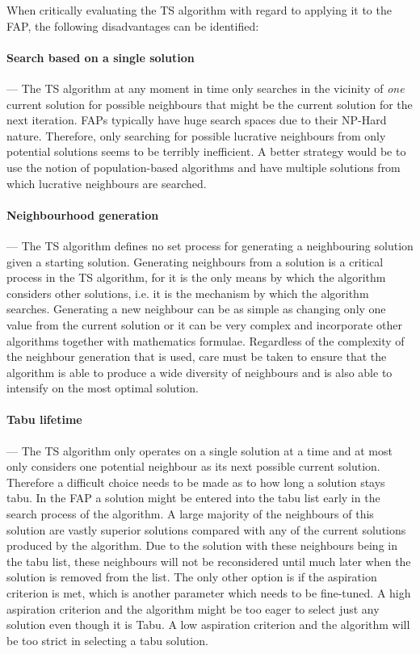 When critically evaluating the TS algorithm with regard to applying it to the FAP, the following disadvantages can be identified:
\paragraph{Search based on a single solution}
--- The TS algorithm at any moment in time only searches in the vicinity of \emph{one} current solution for possible neighbours that might be the current solution for the next iteration. FAPs typically have huge search spaces due to their NP-Hard nature. Therefore, only searching for possible lucrative neighbours from only potential solutions seems to be terribly inefficient. A better strategy would be to use the notion of population-based algorithms and have multiple solutions from which lucrative neighbours are searched.
\paragraph{Neighbourhood generation}
--- The TS algorithm defines no set process for generating a neighbouring solution given a starting solution. Generating neighbours from a solution is a critical process in the TS algorithm, for it is the only means by which the algorithm considers other solutions, i.e. it is the mechanism by which the algorithm searches. Generating a new neighbour can be as simple as changing only one value from the current solution or it can be very complex and incorporate other algorithms together with mathematics formulae. Regardless of the complexity of the neighbour generation that is used, care must be taken to ensure that the algorithm is able to produce a wide diversity of neighbours and is also able to intensify on the most optimal solution.
\paragraph{Tabu lifetime}
--- The TS algorithm only operates on a single solution at a time and at most only considers one potential neighbour as its next possible current solution. Therefore a difficult choice needs to be made as to how long a solution stays tabu. In the FAP a solution might be entered into the tabu list early in the search process of the algorithm. A large majority of the neighbours of this solution are vastly superior solutions compared with any of the current solutions produced by the algorithm. Due to the solution with these neighbours being in the tabu list, these neighbours will not be reconsidered until much later when the solution is removed from the list. The only other option is if the aspiration criterion is met, which is another parameter which needs to be fine-tuned. A high aspiration criterion and the algorithm might be too eager to select just any solution even though it is Tabu. A low aspiration criterion and the algorithm will be too strict in selecting a tabu solution.

